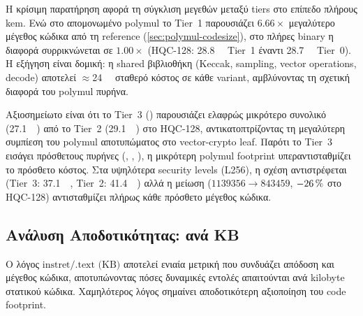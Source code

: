 \begin{table}[htbp]
  \centering
  \caption{Αποτύπωμα  πλήρους \KEM binary ανά tier και
    security level. Τα μεγέθη περιλαμβάνουν polymul, Keccak, decode,
    sampling, και shared  βιβλιοθήκη. Τα μεγέθη μετρήθηκαν με  στα τελικά πλήρη \KEM ELF binaries (), όχι στον polymul microbench harness (πρβλ.\ \cref{fig:code-size-dual-axis}). Πηγή δεδομένων:
    Spike ISS simulation CSVs (commit ).}
  \label{tab:code-size-deployment}
  \small
  
\end{table}

Η κρίσιμη παρατήρηση αφορά τη σύγκλιση μεγεθών μεταξύ tiers στο
επίπεδο πλήρους \gls{kem}. Ενώ στο απομονωμένο polymul το Tier~1 παρουσιάζει
$6.66\times$ μεγαλύτερο μέγεθος κώδικα από τη reference
(\cref{sec:polymul-codesize}), στο πλήρες binary η διαφορά συρρικνώνεται
σε $1.00\times$ (HQC-128: \SI{28.8}{\kilo\byte} Tier~1 έναντι
\SI{28.7}{\kilo\byte} Tier~0). Η εξήγηση είναι δομική: η shared
 βιβλιοθήκη (Keccak, sampling, vector operations, decode)
αποτελεί $\approx$\SI{24}{\kilo\byte} σταθερό κόστος σε κάθε variant,
αμβλύνοντας τη σχετική διαφορά του polymul πυρήνα.

Αξιοσημείωτο είναι ότι το Tier~3 () παρουσιάζει ελαφρώς
μικρότερο συνολικό  (\SI{27.1}{\kilo\byte}) από το Tier~2
(\SI{29.1}{\kilo\byte}) στο HQC-128, αντικατοπτρίζοντας τη μεγαλύτερη
συμπίεση του polymul αποτυπώματος στο vector-crypto leaf. Παρότι το Tier~3
εισάγει πρόσθετους πυρήνες (, ,
), η μικρότερη polymul footprint υπεραντισταθμίζει
το πρόσθετο κόστος. Στα υψηλότερα security levels (L256), η σχέση
αντιστρέφεται (Tier~3: \SI{37.1}{\kilo\byte}, Tier~2: \SI{41.4}{\kilo\byte})
αλλά η μείωση \instret ($\num{1139356} \to \num{843459}$, $-\SI{26}{\percent}$ στο
\Decaps HQC-128) αντισταθμίζει πλήρως κάθε πρόσθετο μέγεθος κώδικα.

\subsection{Ανάλυση Αποδοτικότητας: \instret ανά KB}
\label{ssec:instret-per-kb}

Ο λόγος $\text{instret} / \text{.text (KB)}$ αποτελεί ενιαία μετρική που
συνδυάζει απόδοση και μέγεθος κώδικα, αποτυπώνοντας πόσες δυναμικές εντολές
απαιτούνται ανά kilobyte στατικού κώδικα. Χαμηλότερος λόγος σημαίνει
αποδοτικότερη αξιοποίηση του code footprint.

